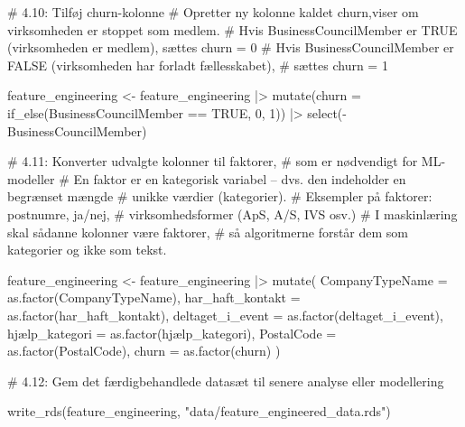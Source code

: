 \documentclass[
  11pt,
  letterpaper,
  DIV=11,
  numbers=noendperiod]{scrartcl}
\newenvironment{Shaded}{\begin{snugshade}}{\end{snugshade}}
\newcommand{\AttributeTok}[1]{\textcolor[rgb]{0.40,0.45,0.13}{#1}}
\newcommand{\CommentTok}[1]{\textcolor[rgb]{0.37,0.37,0.37}{#1}}
\newcommand{\ConstantTok}[1]{\textcolor[rgb]{0.56,0.35,0.01}{#1}}
\newcommand{\DecValTok}[1]{\textcolor[rgb]{0.68,0.00,0.00}{#1}}
\newcommand{\FunctionTok}[1]{\textcolor[rgb]{0.28,0.35,0.67}{#1}}
\newcommand{\NormalTok}[1]{\textcolor[rgb]{0.00,0.23,0.31}{#1}}
\newcommand{\OtherTok}[1]{\textcolor[rgb]{0.00,0.23,0.31}{#1}}
\newcommand{\SpecialCharTok}[1]{\textcolor[rgb]{0.37,0.37,0.37}{#1}}
\newcommand{\StringTok}[1]{\textcolor[rgb]{0.13,0.47,0.30}{#1}}
\begin{document}
\begin{Shaded}
\begin{Highlighting}[]
\CommentTok{\# 4.10: Tilføj churn{-}kolonne}
\CommentTok{\# Opretter ny kolonne kaldet \textquotesingle{}churn\textquotesingle{},viser om virksomheden er stoppet som medlem. }
\CommentTok{\# Hvis BusinessCouncilMember er TRUE (virksomheden er medlem), sættes churn = 0}
\CommentTok{\# Hvis BusinessCouncilMember er FALSE (virksomheden har forladt fællesskabet), }
\CommentTok{\# sættes churn = 1}

\NormalTok{feature\_engineering }\OtherTok{\textless{}{-}}\NormalTok{ feature\_engineering }\SpecialCharTok{|\textgreater{}}
  \FunctionTok{mutate}\NormalTok{(}\AttributeTok{churn =} \FunctionTok{if\_else}\NormalTok{(BusinessCouncilMember }\SpecialCharTok{==} \ConstantTok{TRUE}\NormalTok{, }\DecValTok{0}\NormalTok{, }\DecValTok{1}\NormalTok{)) }\SpecialCharTok{|\textgreater{}}
  \FunctionTok{select}\NormalTok{(}\SpecialCharTok{{-}}\NormalTok{BusinessCouncilMember)}

\CommentTok{\# 4.11: Konverter udvalgte kolonner til faktorer, }
\CommentTok{\# som er nødvendigt for ML{-}modeller}
\CommentTok{\# En faktor er en kategorisk variabel – dvs. den indeholder en begrænset mængde }
\CommentTok{\# unikke værdier (kategorier). \# Eksempler på faktorer: postnumre, ja/nej, }
\CommentTok{\# virksomhedsformer (ApS, A/S, IVS osv.)}
\CommentTok{\# I maskinlæring skal sådanne kolonner være faktorer, }
\CommentTok{\# så algoritmerne forstår dem som kategorier og ikke som tekst.}

\NormalTok{feature\_engineering }\OtherTok{\textless{}{-}}\NormalTok{ feature\_engineering }\SpecialCharTok{|\textgreater{}} 
  \FunctionTok{mutate}\NormalTok{(}
    \AttributeTok{CompanyTypeName =} \FunctionTok{as.factor}\NormalTok{(CompanyTypeName),}
    \AttributeTok{har\_haft\_kontakt =} \FunctionTok{as.factor}\NormalTok{(har\_haft\_kontakt),}
    \AttributeTok{deltaget\_i\_event =} \FunctionTok{as.factor}\NormalTok{(deltaget\_i\_event),}
\NormalTok{    hjælp}\AttributeTok{\_kategori =} \FunctionTok{as.factor}\NormalTok{(hjælp\_kategori),}
    \AttributeTok{PostalCode =} \FunctionTok{as.factor}\NormalTok{(PostalCode),}
    \AttributeTok{churn =} \FunctionTok{as.factor}\NormalTok{(churn)}
\NormalTok{  )}


\CommentTok{\# 4.12: Gem det færdigbehandlede datasæt til senere analyse eller modellering}

\FunctionTok{write\_rds}\NormalTok{(feature\_engineering, }\StringTok{"data/feature\_engineered\_data.rds"}\NormalTok{)}
\end{Highlighting}
\end{Shaded}
\end{document}
